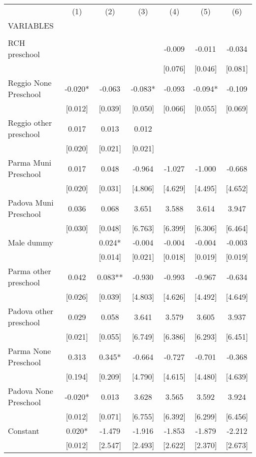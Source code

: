 \begin{tabular}{lcccccc} \hline
 & (1) & (2) & (3) & (4) & (5) & (6) \\
VARIABLES &  &  &  &  &  &  \\ \hline
 &  &  &  &  &  &  \\
RCH preschool &  &  &  & -0.009 & -0.011 & -0.034 \\
 &  &  &  & [0.076] & [0.046] & [0.081] \\
Reggio None Preschool & -0.020* & -0.063 & -0.083* & -0.093 & -0.094* & -0.109 \\
 & [0.012] & [0.039] & [0.050] & [0.066] & [0.055] & [0.069] \\
Reggio other preschool & 0.017 & 0.013 & 0.012 &  &  &  \\
 & [0.020] & [0.021] & [0.021] &  &  &  \\
Parma Muni Preschool & 0.017 & 0.048 & -0.964 & -1.027 & -1.000 & -0.668 \\
 & [0.020] & [0.031] & [4.806] & [4.629] & [4.495] & [4.652] \\
Padova Muni Preschool & 0.036 & 0.068 & 3.651 & 3.588 & 3.614 & 3.947 \\
 & [0.030] & [0.048] & [6.763] & [6.399] & [6.306] & [6.464] \\
Male dummy &  & 0.024* & -0.004 & -0.004 & -0.004 & -0.003 \\
 &  & [0.014] & [0.021] & [0.018] & [0.019] & [0.019] \\
Parma other preschool & 0.042 & 0.083** & -0.930 & -0.993 & -0.967 & -0.634 \\
 & [0.026] & [0.039] & [4.803] & [4.626] & [4.492] & [4.649] \\
Padova other preschool & 0.029 & 0.058 & 3.641 & 3.579 & 3.605 & 3.937 \\
 & [0.021] & [0.055] & [6.749] & [6.386] & [6.293] & [6.451] \\
Parma None Preschool & 0.313 & 0.345* & -0.664 & -0.727 & -0.701 & -0.368 \\
 & [0.194] & [0.209] & [4.790] & [4.615] & [4.480] & [4.639] \\
Padova None Preschool & -0.020* & 0.013 & 3.628 & 3.565 & 3.592 & 3.924 \\
 & [0.012] & [0.071] & [6.755] & [6.392] & [6.299] & [6.456] \\
Constant & 0.020* & -1.479 & -1.916 & -1.853 & -1.879 & -2.212 \\
 & [0.012] & [2.547] & [2.493] & [2.622] & [2.370] & [2.673] \\

\end{tabular}
